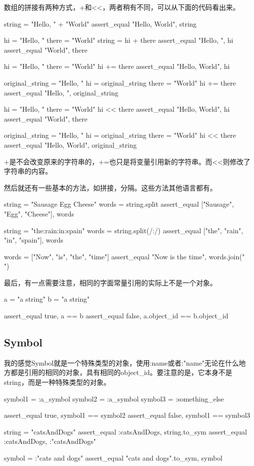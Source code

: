 数组的拼接有两种方式，+和<<，两者稍有不同，可以从下面的代码看出来。
\begin{Ruby}
    string = "Hello, " + "World"
    assert_equal "Hello, World", string
    
    hi = "Hello, "
    there = "World"
    string = hi + there
    assert_equal "Hello, ", hi
    assert_equal "World", there
    
    hi = "Hello, "
    there = "World"
    hi += there
    assert_equal "Hello, World", hi
    
    original_string = "Hello, "
    hi = original_string
    there = "World"
    hi += there
    assert_equal "Hello, ", original_string   
    
    hi = "Hello, "
    there = "World"
    hi << there
    assert_equal "Hello, World", hi
    assert_equal "World", there

    original_string = "Hello, "
    hi = original_string
    there = "World"
    hi << there
    assert_equal "Hello, World", original_string             
\end{Ruby}
+是不会改变原来的字符串的，+=也只是将变量引用新的字符串。而<<则修改了字符串的内容。

然后就还有一些基本的方法，如拼接，分隔。这些方法其他语言都有。
\begin{Ruby}
    string = "Sausage Egg Cheese"
    words = string.split
    assert_equal ["Sausage", "Egg", "Cheese"], words
    
    string = "the:rain:in:spain"
    words = string.split(/:/)
    assert_equal ["the", "rain", "in", "spain"], words
    
    words = ["Now", "is", "the", "time"]
    assert_equal "Now is the time", words.join(" ")        
\end{Ruby}

最后，有一点需要注意，相同的字面常量引用的实际上不是一个对象。
\begin{Ruby}
    a = "a string"
    b = "a string"

    assert_equal true, a           == b
    assert_equal false, a.object_id == b.object_id
\end{Ruby}


\subsection{Symbol}
我的感觉Symbol就是一个特殊类型的对象，使用:name或者:"name"无论在什么地方都是引用的相同的对象，具有相同的object\_id。要注意的是，它本身不是string，而是一种特殊类型的对象。
\begin{Ruby}
    symbol1 = :a_symbol
    symbol2 = :a_symbol
    symbol3 = :something_else

    assert_equal true, symbol1 == symbol2
    assert_equal false, symbol1 == symbol3
    
    string = "catsAndDogs"
    assert_equal :catsAndDogs, string.to_sym
    assert_equal :catsAndDogs, :"catsAndDogs"	    
    
    symbol = :"cats and dogs"
    assert_equal "cats and dogs".to_sym, symbol
\end{Ruby}

